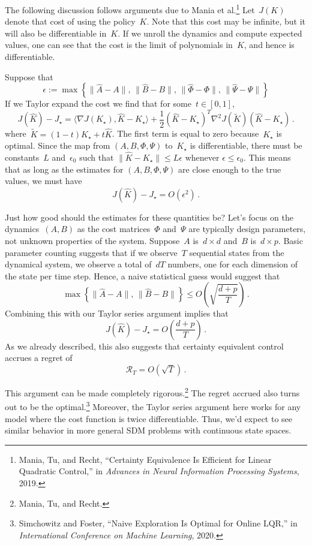 \documentclass{tufte-book}
\begin{document}
The following discussion follows arguments due to Mania et
al.\footnote{Mania, Tu, and Recht, {``Certainty Equivalence Is Efficient
  for Linear Quadratic Control,''} in \emph{Advances in Neural
  Information Processing Systems}, 2019.} Let~\(J(K)\) denote that cost
of using the policy~\(K\). Note that this cost may be infinite, but it
will also be differentiable in~\(K\). If we unroll the dynamics and
compute expected values, one can see that the cost is the limit of
polynomials in~\(K\), and hence is differentiable.

Suppose that \[
    \epsilon := \max \left\{ \|\hat{A}-A\|,\, \|\hat{B}-B\|,\, \|\hat{\Phi}-\Phi\|,\, \|\hat{\Psi}-\Psi\|\right\}
\] If we Taylor expand the cost we find that for some~\(t \in [0,1]\),
\[
    J(\hat{K})-J_\star = \langle \nabla J(K_\star), \hat{K}-K_\star \rangle + \frac{1}{2} (\hat{K}-K_\star)^T \nabla^2 J(\tilde{K})(\hat{K}-K_\star)\,.
\] where~\(\tilde{K} = (1-t)K_\star + t \hat{K}\). The first term is
equal to zero because~\(K_\star\) is optimal. Since the map from
\((A,B,\Phi,\Psi)\) to~\(K_\star\) is differentiable, there must be
constants~\(L\) and~\(\epsilon_0\) such that
\(\|\hat{K}-K_\star\| \leq L \epsilon\) whenever
\(\epsilon \leq \epsilon_0\). This means that as long as the estimates
for \((A,B,\Phi,\Psi)\) are close enough to the true values, we must
have \[
    J(\hat{K})-J_\star = O(\epsilon^2)\,.
\]

Just how good should the estimates for these quantities be? Let's focus
on the dynamics~\((A,B)\) as the cost matrices~\(\Phi\) and~\(\Psi\) are
typically design parameters, not unknown properties of the system.
Suppose~\(A\) is~\(d\times d\) and~\(B\) is~\(d\times p\). Basic
parameter counting suggests that if we observe~\(T\) sequential states
from the dynamical system, we observe a total of~\(dT\) numbers, one for
each dimension of the state per time step. Hence, a naive statistical
guess would suggest that \[
 \max \left\{ \|\hat{A}-A\|,\, \|\hat{B}-B\|\right\} \leq O\left(\sqrt{\frac{d+p}{T}}\right)\,.
\] Combining this with our Taylor series argument implies that \[
    J(\hat{K})-J_\star = O\left(\frac{d+p}{T}\right)\,.
\] As we already described, this also suggests that certainty equivalent
control accrues a regret of \[
    \mathcal{R}_T = O(\sqrt{T})\,.
\]

This argument can be made completely rigorous.\footnote{Mania, Tu, and
  Recht.} The regret accrued also turns out to be the
optimal.\footnote{Simchowitz and Foster, {``Naive Exploration Is Optimal
  for Online {LQR},''} in \emph{International Conference on Machine
  Learning}, 2020.} Moreover, the Taylor series argument here works for
any model where the cost function is twice differentiable. Thus, we'd
expect to see similar behavior in more general SDM problems with
continuous state spaces.
\end{document}
